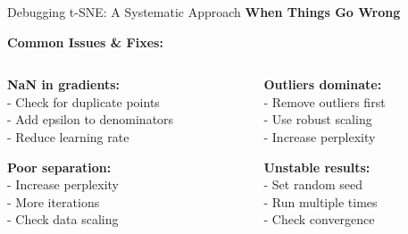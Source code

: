 \documentclass[10pt]{beamer}
\newcommand{\emphtext}[1]{\textcolor{upcblue}{\textbf{#1}}}
\begin{document}
\begin{frame}{Debugging t-SNE: A Systematic Approach}
\emphtext{When Things Go Wrong}

\vspace{0.3cm}
\begin{center}
\end{center}

\vspace{0.3cm}
\textbf{Common Issues \& Fixes:}

\begin{columns}[T]
\begin{column}{0.48\textwidth}
\footnotesize
\textbf{NaN in gradients:}\\
- Check for duplicate points\\
- Add epsilon to denominators\\
- Reduce learning rate

\textbf{Poor separation:}\\
- Increase perplexity\\
- More iterations\\
- Check data scaling
\end{column}

\begin{column}{0.48\textwidth}
\footnotesize
\textbf{Outliers dominate:}\\
- Remove outliers first\\
- Use robust scaling\\
- Increase perplexity

\textbf{Unstable results:}\\
- Set random seed\\
- Run multiple times\\
- Check convergence
\end{column}
\end{columns}
\end{frame}
\end{document}
